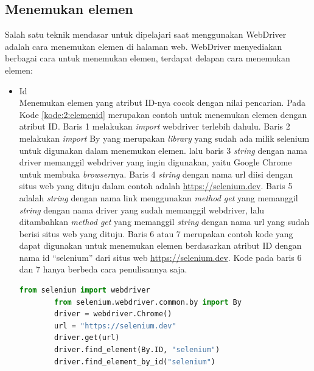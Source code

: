 \subsection{Menemukan elemen}
Salah satu teknik mendasar untuk dipelajari saat menggunakan WebDriver adalah cara menemukan elemen di halaman web. WebDriver menyediakan berbagai cara untuk menemukan elemen, terdapat delapan cara menemukan elemen:
\begin{itemize}
	\item Id \\
	Menemukan elemen yang atribut ID-nya cocok dengan nilai pencarian. Pada Kode \ref{kode:2:elemenid} merupakan contoh untuk menemukan elemen dengan atribut ID. Baris 1 melakukan \textit{import} webdriver terlebih dahulu. Baris 2 melakukan \textit{import} By yang merupakan \textit{library} yang sudah ada milik selenium untuk digunakan dalam menemukan elemen. lalu baris 3 \textit{string} dengan nama driver memanggil webdriver yang ingin digunakan, yaitu Google Chrome untuk membuka \textit{browser}nya. Baris 4 \textit{string} dengan nama url diisi dengan situs web yang dituju dalam contoh adalah \url{https://selenium.dev}. Baris 5 adalah \textit{string} dengan nama link menggunakan \textit{method get} yang memanggil \textit{string} dengan nama driver yang sudah memanggil webdriver, lalu ditambahkan \textit{method get} yang memanggil \textit{string} dengan nama url yang sudah berisi situs web yang dituju. Baris 6 atau 7 merupakan contoh kode yang dapat digunakan untuk menemukan elemen berdasarkan atribut ID dengan nama id ``selenium'' dari situs web \url{https://selenium.dev}. Kode pada baris 6 dan 7 hanya berbeda cara penulisannya saja. 
	\begin{lstlisting}[language=python, caption=Contoh kode untuk menemukan elemen dengan atribut ID, label=kode:2:elemenid]
		from selenium import webdriver
		from selenium.webdriver.common.by import By
		driver = webdriver.Chrome()
		url = "https://selenium.dev"
		driver.get(url)
		driver.find_element(By.ID, "selenium")	
		driver.find_element_by_id("selenium")
	\end{lstlisting}
	

\end{itemize}
